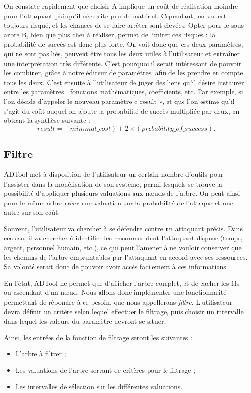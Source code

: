 			On constate rapidement que choisir A implique un coût de réalisation moindre pour l'attaquant puisqu'il nécessite peu de matériel. Cependant, un vol est toujours risqué, et les chances de se faire arrêter sont élevées. Opter pour le sous-arbre B, bien que plus cher à réaliser, permet de limiter ces risques : la probabilité de succès est donc plus forte. On voit donc que ces deux paramètres, qui ne sont pas liés, peuvent être tous les deux utiles à l'utilisateur et entraîner une interprétation très différente. C'est pourquoi il serait intéressant de pouvoir les combiner, grâce à notre éditeur de paramètres, afin de les prendre en compte tous les deux. C'est ensuite à l'utilisateur de juger des liens qu'il désire instaurer entre les paramètres : fonctions mathématiques, coefficients, etc. Par exemple, si l'on décide d'appeler le nouveau paramètre « result », et que l'on estime qu'il s'agit du coût auquel on ajoute la probabilité de succès multipliée par deux, on obtient la synthèse suivante : \[ result = (minimal\_cost) + 2 \times (probability\_of\_success).\]


	\subsection{Filtre}
		ADTool met à disposition de l'utilisateur un certain nombre d'outils pour l'assister dans la modélisation de son système, parmi lesquels se trouve la possibilité d'appliquer plusieurs valuations aux nœuds de l'arbre. On peut ainsi pour le même arbre créer une valuation sur la probabilité de l'attaque et une autre sur son coût.

		Souvent, l'utilisateur va chercher à se défendre contre un attaquant précis. Dans ces cas, il va chercher à identifier les ressources dont l'attaquant dispose (temps, argent, personnel humain, etc.), ce qui peut l'amener à ne vouloir conserver que les chemins de l'arbre empruntables par l'attaquant en accord avec ses ressources. Sa volonté serait donc de pouvoir avoir accès facilement à ces informations.

		En l'état, ADTool ne permet que d'afficher l'arbre complet, et de cacher les fils ou ascendant d'un nœud. Nous allons donc implémenter une fonctionnalité permettant de répondre à ce besoin, que nous appellerons \textit{filtre}. L’utilisateur devra définir un critère selon lequel effectuer le filtrage, puis choisir un intervalle dans lequel les valeurs du paramètre devront se situer.

		Ainsi, les entrées de la fonction de filtrage seront les suivantes : 
		\begin{itemize}
			\item L'arbre à filtrer ;
			\item Les valuations de l'arbre servant de critères pour le filtrage ;
			\item Les intervalles de sélection sur les différentes valuations.
		\end{itemize} %


